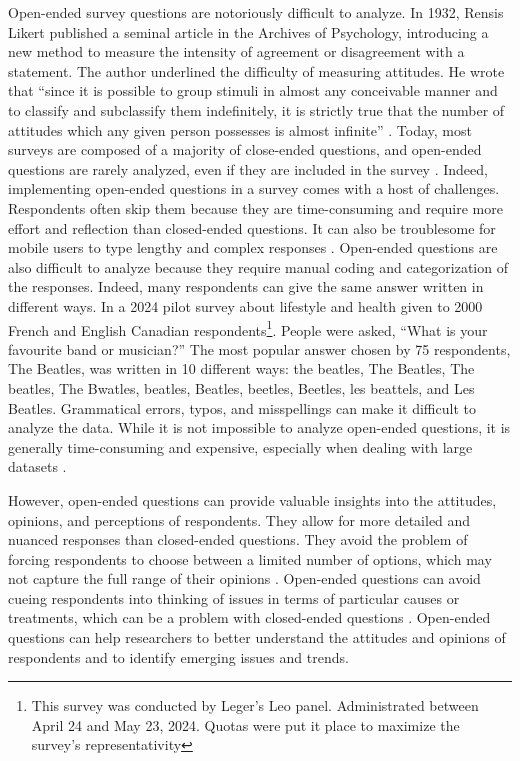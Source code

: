\documentclass[
  authoryear,
  preprint,
  3p]{elsarticle}
\begin{document}
Open-ended survey questions are notoriously difficult to analyze. In
1932, Rensis Likert published a seminal article in the Archives of
Psychology, introducing a new method to measure the intensity of
agreement or disagreement with a statement. The author underlined the
difficulty of measuring attitudes. He wrote that ``since it is possible
to group stimuli in almost any conceivable manner and to classify and
subclassify them indefinitely, it is strictly true that the number of
attitudes which any given person possesses is almost infinite''
\citep{likert32}. Today, most surveys are composed of a majority of
close-ended questions, and open-ended questions are rarely analyzed,
even if they are included in the survey \citep{Roberts_2014}. Indeed,
implementing open-ended questions in a survey comes with a host of
challenges. Respondents often skip them because they are time-consuming
and require more effort and reflection than closed-ended questions. It
can also be troublesome for mobile users to type lengthy and complex
responses \citep{dillman_etal14}. Open-ended questions are also
difficult to analyze because they require manual coding and
categorization of the responses. Indeed, many respondents can give the
same answer written in different ways. In a 2024 pilot survey about
lifestyle and health given to 2000 French and English Canadian
respondents\footnote{This survey was conducted by Leger's Leo panel.
  Administrated between April 24 and May 23, 2024. Quotas were put it
  place to maximize the survey's representativity}. People were asked,
``What is your favourite band or musician?'' The most popular answer
chosen by 75 respondents, The Beatles, was written in 10 different ways:
the beatles, The Beatles, The beatles, The Bwatles, beatles, Beatles,
beetles, Beetles, les beattels, and Les Beatles. Grammatical errors,
typos, and misspellings can make it difficult to analyze the data. While
it is not impossible to analyze open-ended questions, it is generally
time-consuming and expensive, especially when dealing with large
datasets
\citep{dillman_etal14, bradburn_etal04, roberts_etal14, schuman_presser96}.

However, open-ended questions can provide valuable insights into the
attitudes, opinions, and perceptions of respondents. They allow for more
detailed and nuanced responses than closed-ended questions. They avoid
the problem of forcing respondents to choose between a limited number of
options, which may not capture the full range of their opinions
\citep{dillman_etal14}. Open-ended questions can avoid cueing
respondents into thinking of issues in terms of particular causes or
treatments, which can be a problem with closed-ended questions
\citep{roberts_etal14, iyengar96}. Open-ended questions can help
researchers to better understand the attitudes and opinions of
respondents and to identify emerging issues and trends.
\end{document}
